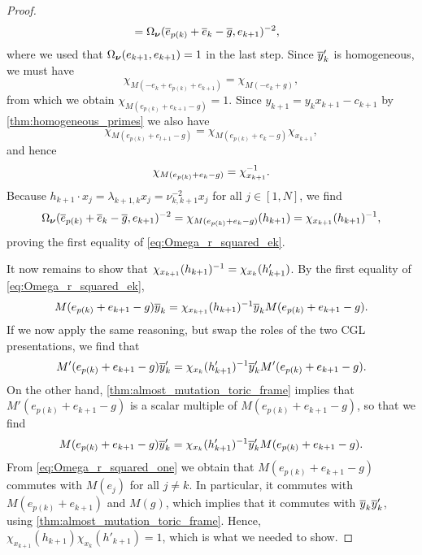 \begin{proof}
\begin{align*}
		                                         & = \Omega_{\boldsymbol{\nu}}(\overline{e}_{p(k)} + \overline{e}_k - \overline{g}, e_{k+1})^{-2},
	\end{align*}
	where we used that $\Omega_{\boldsymbol{\nu}}(e_{k+1}, e_{k+1}) = 1$ in the last step. Since
	$\overline{y}'_k$ is homogeneous, we must have
	\begin{equation*}
		\chi_{M(-e_k + e_{p(k)} + e_{k+1})} = \chi_{M(-e_k + g)},
	\end{equation*}
	from which we obtain $\chi_{M(e_{p(k)} + e_{k+1} - g)} = 1$. Since $y_{k+1} = y_k
		x_{k+1} - c_{k+1}$ by \cref{thm:homogeneous_primes} we also have
	\begin{equation*}
		\chi_{M(e_{p(k)} + e_{l+1} -g)} = \chi_{M(e_{p(k)} + e_k - g)}\chi_{x_{k+1}},
	\end{equation*}
	and hence
	\begin{equation*}
		\chi_{M(e_{p(k)} + e_k - g)} = \chi_{x_{k+1}}^{-1}.
	\end{equation*}
	Because $h_{k+1} \cdot x_j = \lambda_{k+1, k} x_j = \nu_{k, k+1}^{-2}x_j$ for all $j
		\in [1, N]$, we find
	\begin{equation*}
		\Omega_{\boldsymbol{\nu}}(\overline{e}_{p(k)}+\overline{e}_k - \overline{g}, e_{k+1})^{-2} = \chi_{M(e_{p(k)} + e_k - g)}(h_{k+1}) = \chi_{x_{k+1}}(h_{k+1})^{-1},
	\end{equation*}
	proving the first equality of \cref{eq:Omega_r_squared_ek}.

	It now remains to show that $\chi_{x_{k+1}}(h_{k+1})^{-1} = \chi_{x_k}(h'_{k+1})$. By
	the first equality of \cref{eq:Omega_r_squared_ek},
	\begin{equation*}
		M(e_{p(k)} + e_{k+1} - g)\overline{y}_k = \chi_{x_{k+1}}(h_{k+1})^{-1} \overline{y}_k M(e_{p(k)} + e_{k+1} - g).
	\end{equation*}
	If we now apply the same reasoning, but swap the roles of the two CGL presentations, we
	find that
	\begin{equation*}
		M'(e_{p(k)} + e_{k+1} - g)\overline{y}'_k = \chi_{x_k}(h'_{k+1})^{-1} \overline{y}'_k M'(e_{p(k)} + e_{k+1} - g).
	\end{equation*}
	On the other hand, \cref{thm:almost_mutation_toric_frame} implies that $M'(e_{p(k)} +
		e_{k+1} - g)$ is a scalar multiple of $M(e_{p(k)} + e_{k+1} - g)$, so that we find
	\begin{equation*}
		M(e_{p(k)} + e_{k+1} - g)\overline{y}'_k = \chi_{x_k}(h'_{k+1})^{-1} \overline{y}'_k M(e_{p(k)} + e_{k+1} - g).
	\end{equation*}
	From \cref{eq:Omega_r_squared_one} we obtain that $M(e_{p(k)} + e_{k+1} - g)$ commutes
	with $M(e_j)$ for all $j \neq k$. In particular, it commutes with $M(e_{p(k)} +
		e_{k+1})$ and $M(g)$, which implies that it commutes with $\overline{y}_k \overline{y}'_k$, using
	\cref{thm:almost_mutation_toric_frame}. Hence,
	$\chi_{x_{k+1}}(h_{k+1})\chi_{x_k}(h'_{k+1}) = 1$, which is what we needed to show.

\end{proof}


